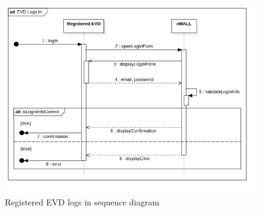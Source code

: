 \begin{center}
    \begin{figure} [H]
        \begin{center}
            \includegraphics[width=0.9\linewidth]{Images/SequenceDiagrams/evd_logs_in}
            \caption{Registered EVD logs in sequence diagram}
            \label{fig: evd_logs_in_seq_diag}
        \end{center}
    \end{figure}
\end{center}

